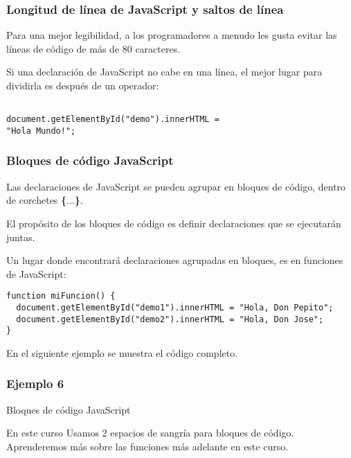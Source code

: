 \begin{frame}[fragile]
  \frametitle{Longitud de línea de JavaScript y saltos de línea}

  Para una mejor legibilidad, a los programadores a menudo
  les gusta evitar las líneas de código de más de 80 caracteres.

  \vspace{\baselineskip}
  Si una declaración de JavaScript no cabe en una línea,
  el mejor lugar para dividirla es después de un operador:

  \vspace{\baselineskip}
  \begin{lstlisting}

document.getElementById("demo").innerHTML =
"Hola Mundo!";

  \end{lstlisting}
\end{frame}

\begin{frame}[fragile]
  \frametitle{Bloques de código JavaScript}

  Las declaraciones de JavaScript se pueden agrupar
  en bloques de código, dentro de corchetes \textbf{\{}...\textbf{\}}.

  \vspace{\baselineskip}
  El propósito de los bloques de código es definir declaraciones
  que se ejecutarán juntas.

  \vspace{\baselineskip}
  Un lugar donde encontrará declaraciones agrupadas en bloques,
  es en funciones de JavaScript:

  \vspace{\baselineskip}
  \begin{lstlisting}
function miFuncion() {
  document.getElementById("demo1").innerHTML = "Hola, Don Pepito";
  document.getElementById("demo2").innerHTML = "Hola, Don Jose";
}
  \end{lstlisting}

  \vspace{\baselineskip}
  En el siguiente ejemplo se muestra el código completo.
\end{frame}

\begin{frame}[fragile]
  \frametitle{Ejemplo 6}
  
\end{frame}

\begin{frame}[c]{Bloques de código JavaScript}

  \begin{block}{En este curso}
    Usamos 2 espacios de sangría para bloques de código.
    Aprenderemos más sobre las funciones más adelante en este curso.
  \end{block}
\end{frame}

